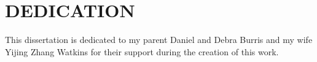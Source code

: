 
\chapter*{DEDICATION}


This dissertation is dedicated to my parent Daniel and Debra Burris and my wife Yijing Zhang Watkins for their support during the creation of this work.

\newpage
